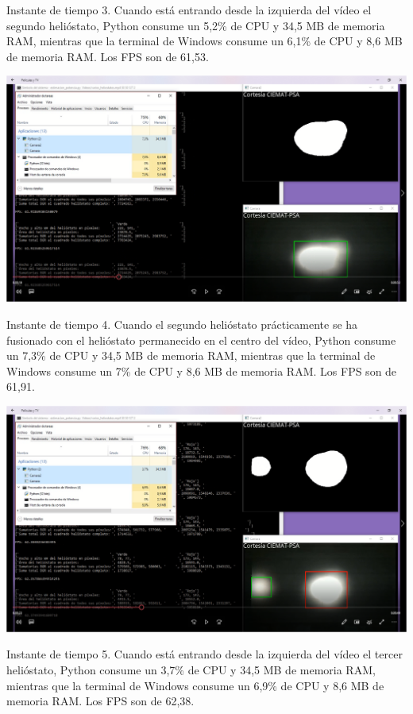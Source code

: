 \documentclass[12pt]{article}
\begin{document}
Instante de tiempo 3. Cuando está entrando desde la izquierda del vídeo el segundo helióstato, Python consume un 5,2\% de CPU y 34,5 MB de memoria RAM, mientras que la terminal de Windows consume un 6,1\% de CPU y 8,6 MB de memoria RAM. Los FPS son de 61,53.


\includegraphics[width=\textwidth]{CapturasRendimientoSoftware1/Imagen4.png}

Instante de tiempo 4. Cuando el segundo helióstato prácticamente se ha fusionado con el helióstato permanecido en el centro del vídeo, Python consume un 7,3\% de CPU y 34,5 MB de memoria RAM, mientras que la terminal de Windows consume un 7\% de CPU y 8,6 MB de memoria RAM. Los FPS son de 61,91.


\includegraphics[width=\textwidth]{CapturasRendimientoSoftware1/Imagen5.png}

Instante de tiempo 5. Cuando está entrando desde la izquierda del vídeo el tercer helióstato, Python consume un 3,7\% de CPU y 34,5 MB de memoria RAM, mientras que la terminal de Windows consume un 6,9\% de CPU y 8,6 MB de memoria RAM. Los FPS son de 62,38.
\end{document}
